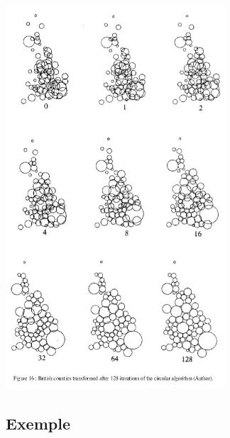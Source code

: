 \documentclass[]{book}
\begin{document}
\includegraphics{img/dorling1.png}

\hypertarget{exemple}{%
\subsection{Exemple}\label{exemple}}
\end{document}
